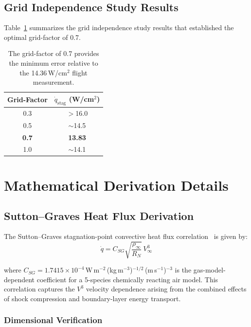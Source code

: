 \section{Grid Independence Study Results}

Table~\ref{tab:grid_study} summarizes the grid independence study results that established the optimal grid-factor of 0.7.

\begin{table}[H]
\centering
\caption{Grid independence study: stagnation-point heat flux vs.\ grid-factor.}
\label{tab:grid_study}
\begin{tabular}{cc}
\hline
\textbf{Grid-Factor} & \textbf{$\dot{q}_{\text{stag}}$ (W/cm$^2$)} \\
\hline
0.3 & $>$16.0 \\
0.5 & $\sim$14.5 \\
\textbf{0.7} & \textbf{13.83} \\
1.0 & $\sim$14.1 \\
\hline
\end{tabular}
\caption*{The grid-factor of 0.7 provides the minimum error relative to the 14.36\,W/cm$^2$ flight measurement.}
\end{table}

\chapter{Mathematical Derivation Details}
\label{app:derivations}

\section{Sutton--Graves Heat Flux Derivation}

The Sutton--Graves stagnation-point convective heat flux correlation~\cite{sutton1971gravesh} is given by:
\begin{equation}
    \dot{q} = C_{SG} \sqrt{\frac{\rho_\infty}{R_N}} \, V_\infty^3
    \label{eq:sg_derivation}
\end{equation}

\noindent where $C_{SG} = 1.7415 \times 10^{-4}$\,W\,m$^{-2}$\,(kg\,m$^{-3}$)$^{-1/2}$\,(m\,s$^{-1}$)$^{-3}$ is the gas-model-dependent coefficient for a 5-species chemically reacting air model. This correlation captures the $V^3$ velocity dependence arising from the combined effects of shock compression and boundary-layer energy transport.

\subsection{Dimensional Verification}

